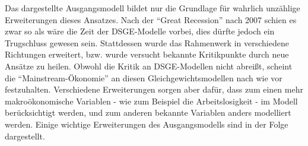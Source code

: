 Das dargestellte Ausgangsmodell bildet nur die Grundlage für wahrlich unzählige Erweiterungen dieses Ansatzes. Nach der "`Great Recession"' nach 2007 schien es zwar so als wäre die Zeit der DSGE-Modelle vorbei, dies dürfte jedoch ein Trugschluss gewesen sein. 
Stattdessen wurde das Rahmenwerk in verschiedene Richtungen erweitert, bzw. wurde versucht bekannte Kritikpunkte durch neue Ansätze zu heilen. Obwohl die Kritik an DSGE-Modellen nicht abreißt, scheint die "`Mainstream-Ökonomie"' an diesen Gleichgewichtsmodellen nach wie vor festzuhalten. Verschiedene Erweiterungen sorgen aber dafür, dass zum einen mehr makroökonomische Variablen - wie zum Beispiel die Arbeitslosigkeit - im Modell berücksichtigt werden, und zum anderen bekannte Variablen anders modelliert werden. Einige wichtige Erweiterungen des Ausgangsmodells sind in der Folge dargestellt.

